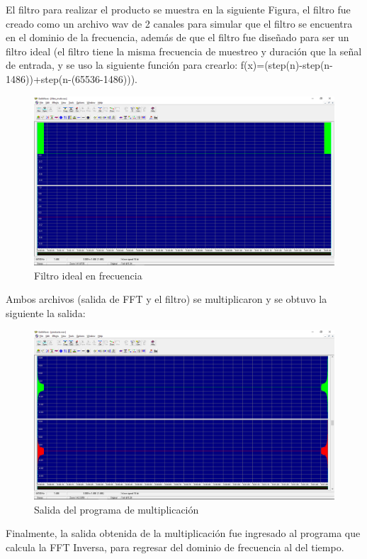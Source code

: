 El filtro para realizar el producto se muestra en la siguiente Figura, el filtro fue creado como un archivo wav de 2 canales para simular que el filtro se encuentra en el dominio de la frecuencia, además de que el filtro fue diseñado para ser un filtro ideal (el filtro tiene la misma frecuencia de muestreo y duración que la señal de entrada, y se uso la siguiente función para crearlo: f(x)=(step(n)-step(n-1486))+step(n-(65536-1486))).
\begin{figure}[H]
	\centering
	\includegraphics[scale=.3]{img/filtro.png}
	\caption{Filtro ideal en frecuencia}
	\label{fig:prueba2sd}		
\end{figure}
Ambos archivos (salida de FFT y el filtro) se multiplicaron y se obtuvo la siguiente la salida:
\begin{figure}[H]
	\centering
	\includegraphics[scale=.35]{img/producto.png}
	\caption{Salida del programa de multiplicación}
	\label{fig:prueba2s}		
\end{figure}
Finalmente, la salida obtenida de la multiplicación fue ingresado al programa que calcula la FFT Inversa, para regresar del dominio de frecuencia al del tiempo.
